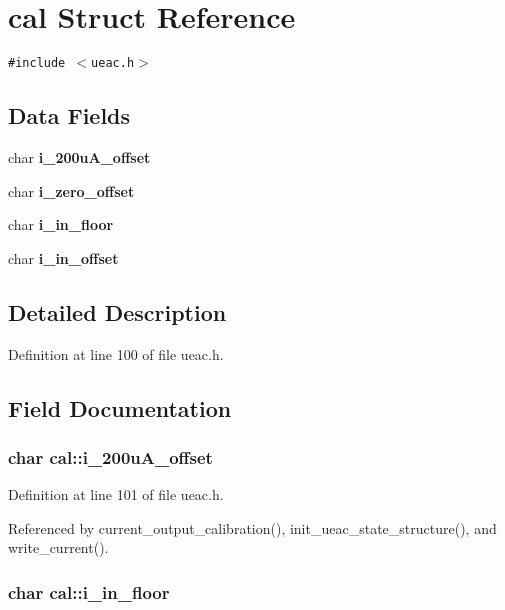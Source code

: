 \section{cal Struct Reference}
\label{structcal}
{\tt \#include $<$ueac.h$>$}

\subsection*{Data Fields}
\begin{CompactItemize}
\item 
char {\bf i\_\-200u\-A\_\-offset}
\item 
char {\bf i\_\-zero\_\-offset}
\item 
char {\bf i\_\-in\_\-floor}
\item 
char {\bf i\_\-in\_\-offset}
\end{CompactItemize}


\subsection{Detailed Description}




Definition at line 100 of file ueac.h.

\subsection{Field Documentation}
\subsubsection{\setlength{\rightskip}{0pt plus 5cm}char {\bf cal::i\_\-200u\-A\_\-offset}}\label{structcal_o0}




Definition at line 101 of file ueac.h.

Referenced by current\_\-output\_\-calibration(), init\_\-ueac\_\-state\_\-structure(), and write\_\-current().
\subsubsection{\setlength{\rightskip}{0pt plus 5cm}char {\bf cal::i\_\-in\_\-floor}}\label{structcal_o2}




